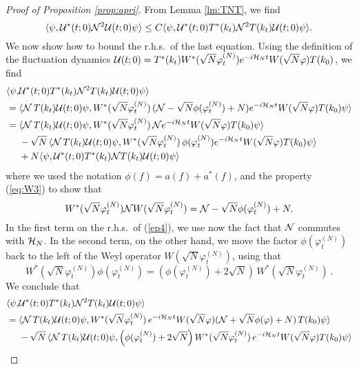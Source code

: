 \documentclass[11pt,a4paper]{article}
\newcommand{\cU}{{\cal U}}
\newcommand{\cH}{{\cal H}}
\newcommand{\cN}{{\cal N}}
\newcommand{\N}{\mathcal{N}}
\begin{document}
\begin{proof}[Proof of Proposition \ref{prop:apri}]
{F}rom Lemma \ref{lm:TNT}, we find
\begin{equation}\label{ep4-0}   \langle \psi , \cU^* (t;0) \cN^2 \cU (t;0) \psi \rangle \leq C  \langle \psi , \cU^* (t;0) T^* (k_t) \cN^2 T (k_t) \cU (t;0) \psi \rangle. \end{equation}
We now show how to bound the r.h.s.\ of the last equation. Using the definition of the fluctuation dynamics $\cU (t;0) = T^* (k_t) W^* (\sqrt{N} \varphi_t^{(N)}) e^{-i\cH_N t} W(\sqrt{N} \varphi) T(k_0)$, we find 
\begin{equation}\label{ep4}
\begin{split}
\langle \psi, &\cU^* (t;0) T^* (k_t) \N^2 T (k_t) \cU (t;0) \psi \rangle 
     \\  = \; & \langle \cN \, T (k_t) \cU (t;0) \psi,  W^* (\sqrt{N} \varphi_t^{(N)}) \, (\cN - \sqrt{N} \phi (\varphi_t^{(N)}) + N) e^{-i\cH_N t}  W (\sqrt{N} \varphi) T (k_0) \psi \rangle \\
      = \; & \langle \cN \, T (k_t) \cU (t;0) \psi,  W^* (\sqrt{N} \varphi_t^{(N)}) \,  \cN e^{-i \cH_N t}
      W (\sqrt{N} \varphi) T (k_0) \psi \rangle \\ & - \sqrt{N} \, \langle \cN \, T (k_t) \cU (t;0) \psi,  W^* (\sqrt{N} \varphi_t^{(N)} )\, \phi (\varphi_t^{(N)}) e^{-i \cH_N t}  W (\sqrt{N} \varphi) T (k_0) \psi \rangle \\
      &+  N  \langle \psi,\cU^* (t;0) T^* (k_t) \cN T (k_t) \cU (t;0) \psi \rangle 
      \end{split} \end{equation}
where we used the notation $\phi (f) = a( f) + a^* (f)$, and the property (\ref{eq:W3}) to show that 
\[ W^* (\sqrt{N} \varphi_t^{(N)}) \cN W (\sqrt{N} \varphi_t^{(N)}) = \cN - \sqrt{N} \phi (\varphi_t^{(N)})  +N.  \]      
In the first term on the r.h.s.\ of (\ref{ep4}), we use now the fact that $\cN$ commutes with $\cH_N$. In the second term, on the other hand, we move the factor $\phi (\varphi_t^{(N)})$ back to the left of the Weyl operator $W (\sqrt{N} \varphi_t^{(N)})$, using that \[ W^* (\sqrt{N} \varphi_t^{(N)}) \phi (\varphi_t^{(N)}) = \left(\phi (\varphi_t^{(N)}) + 2 \sqrt{N} \right) \, W^* (\sqrt{N} \varphi_t^{(N)})\,. \] We conclude that
\begin{equation}\begin{split}
\langle \psi , &\cU^* (t;0) T^* (k_t) \cN^2 T(k_t) \cU (t;0) \psi \rangle \\ = \; & \langle \cN \, T (k_t) \cU (t;0) \psi,  W^* (\sqrt{N} \varphi_t^{(N)}) \,  e^{-i \cH_N t} W (\sqrt{N} \varphi) (\cN + \sqrt{N} \phi (\varphi) + N) \, T (k_0) \psi \rangle \\ &-  \sqrt{N} \, \langle \cN \, T (k_t) \cU (t;0) \psi,  \left(\phi (\varphi_t^{(N)}) + 2\sqrt{N} \right)  W^* (\sqrt{N} \varphi_t^{(N)}) \, e^{-i \cH_N t}  W (\sqrt{N} \varphi) T (k_0) \psi \rangle \\

\end{split}
\end{equation}
\end{proof}
\end{document}

